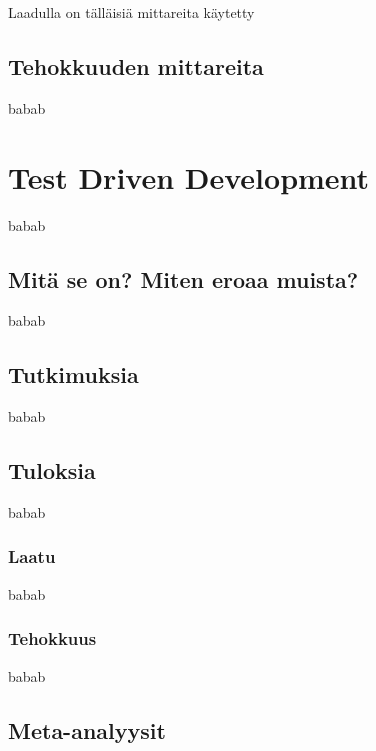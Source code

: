 \documentclass[finnish]{tktltiki2}
\theoremstyle{definition}
\theoremstyle{remark}
\begin{document}
Laadulla on tälläisiä mittareita käytetty


\subsection{Tehokkuuden mittareita}

babab

\section{Test Driven Development}


babab

\subsection{Mitä se on? Miten eroaa muista?}

babab


\subsection{Tutkimuksia}

babab




\subsection{Tuloksia}

babab

\subsubsection{Laatu}

babab

\subsubsection{Tehokkuus}

babab


\subsection{Meta-analyysit}

\end{document}
